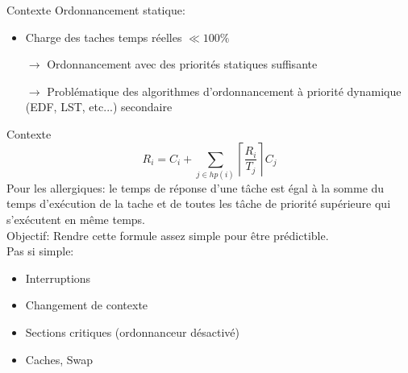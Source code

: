\begin{frame}{Contexte}
  Ordonnancement statique:
  \begin{itemize}
    \item Charge des taches temps réelles $\ll 100\%$
    \item[$\to$] Ordonnancement avec des priorités statiques suffisante
    \item[$\to$] Problématique des algorithmes d'ordonnancement à priorité dynamique (EDF, LST, etc...) secondaire
  \end{itemize}
\end{frame}

\begin{frame}{Contexte}
$$
R_i = C_i + \sum_{j \in hp(i)} \left\lceil\frac{R_i}{T_j}\right\rceil C_j
$$
Pour les allergiques: le temps de réponse d'une tâche est égal à la somme du
temps d'exécution de la tache et de toutes les tâche de priorité supérieure
qui s'exécutent en même temps.\\[1.5ex]
Objectif: Rendre cette formule assez simple pour être prédictible.\\[1.5ex]
Pas si simple:
  \begin{itemize}
    \item Interruptions
    \item Changement de contexte
    \item Sections critiques (ordonnanceur désactivé)
    \item Caches, Swap
  \end{itemize}
\end{frame}

